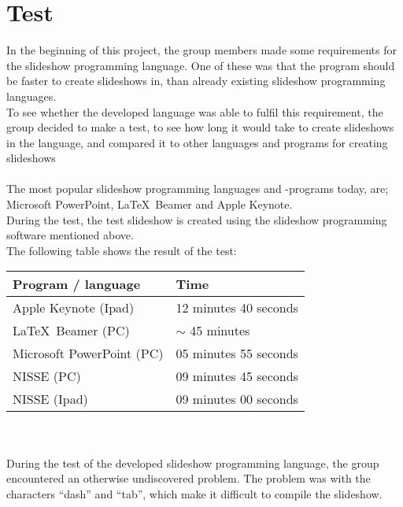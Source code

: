 \chapter{Test}
In the beginning of this project, the group members made some requirements for the slideshow programming language. One of these was that the program should be faster to create slideshows in, than already existing slideshow programming languages. \\
To see whether the developed language was able to fulfil this requirement, the group decided to make a test, to see how long it would take to create slideshows in the language, and compared it to other languages and programs for creating slideshows
\\ \\
The most popular slideshow programming languages and -programs today, are; Microsoft PowerPoint, \LaTeX~Beamer and Apple Keynote. \\
During the test, the test slideshow is created using the slideshow programming software mentioned above. \\
The following table shows the result of the test:

\begin{center}
   \begin{tabular}{ | l | l |}
    \hline
    Program / language & Time \\ \hline
    Apple Keynote (Ipad) & 12 minutes 40 seconds \\ \hline
    \LaTeX~Beamer (PC) & $\sim$ 45 minutes \\ \hline
    Microsoft PowerPoint (PC) & 05 minutes 55 seconds \\ \hline
    NISSE (PC) & 09 minutes 45 seconds \\ \hline
    NISSE (Ipad) & 09 minutes 00 seconds \\ \hline
    \end{tabular}
\end{center}

\\ \\
During the test of the developed slideshow programming language, the group encountered an otherwise undiscovered problem. The problem was with the characters ``dash'' and ``tab'', which make it difficult to compile the slideshow.